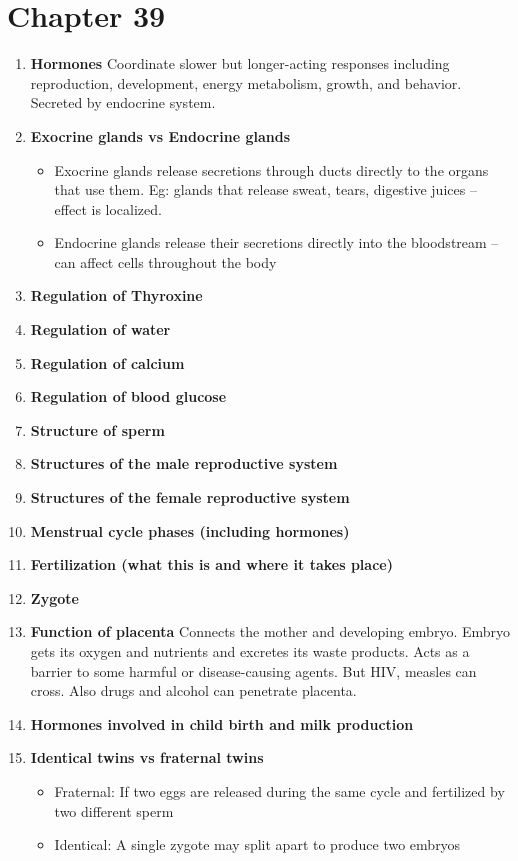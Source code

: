\documentclass[9pt]{article}
\begin{document}
\section*{Chapter 39}
\begin{enumerate}
  \item {\bf Hormones} Coordinate slower but longer-acting responses
    including reproduction, development, energy metabolism, growth,
    and behavior. Secreted by endocrine system.
  \item {\bf Exocrine glands vs Endocrine glands}
    \begin{itemize}
      \item Exocrine glands release secretions through ducts directly
        to the organs that use them. Eg: glands that release sweat,
        tears, digestive juices – effect is localized.
      \item Endocrine glands release their secretions directly into
        the bloodstream – can affect cells throughout the body
    \end{itemize}
  \item {\bf Regulation of Thyroxine}
  \item {\bf Regulation of water}
  \item {\bf Regulation of calcium}
  \item {\bf Regulation of blood glucose}
  \item {\bf Structure of sperm}
  \item {\bf Structures of the male reproductive system}
  \item {\bf Structures of the female reproductive system}
  \item {\bf Menstrual cycle phases (including hormones)}
  \item {\bf Fertilization (what this is and where it takes place)}
  \item {\bf Zygote}
  \item {\bf Function of placenta} Connects the mother and developing
    embryo. Embryo gets its oxygen and nutrients and excretes its
    waste products. Acts as a barrier to some harmful or
    disease-causing agents. But HIV, measles can cross. Also drugs and
    alcohol can penetrate placenta.
  \item {\bf Hormones involved in child birth and milk production}
  \item {\bf Identical twins vs fraternal twins}
    \begin{itemize}
    \item Fraternal: If two eggs are released during the same cycle
      and fertilized by two different sperm
    \item Identical: A single zygote may split apart to produce two
      embryos
    \end{itemize}
\end{enumerate}
\end{document}
